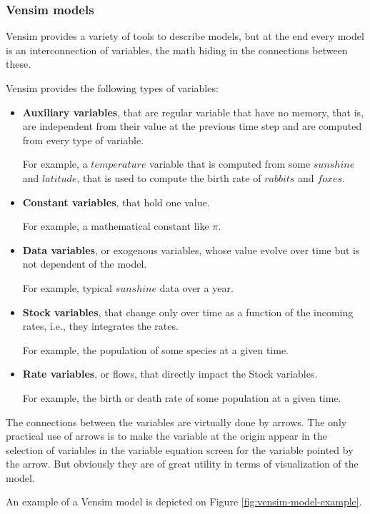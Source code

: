 \subsubsection{Vensim models}

Vensim provides a variety of tools to describe models, but at the end every model is an interconnection of variables, the math hiding in the connections between these. 

Vensim provides the following types of variables:
\begin{itemize}
    \item \textbf{Auxiliary variables}, that are regular variable that have no memory, that is, are independent from their value at the previous time step and are computed from every type of variable.

    For example, a $temperature$ variable that is computed from some $sunshine$ and $latitude$, that is used to compute the birth rate of $rabbits$ and $foxes$.

    \item \textbf{Constant variables}, that hold one value.
    
    For example, a mathematical constant like $\pi$.

    \item \textbf{Data variables}, or exogenous variables, whose value evolve over time but is not dependent of the model.

    For example, typical $sunshine$ data over a year.

    \item \textbf{Stock variables}, that change only over time as a function of the incoming rates, i.e., they integrates the rates.

    For example, the population of some species at a given time.

    \item \textbf{Rate variables}, or flows, that directly impact the Stock variables. 

    For example, the birth or death rate of some population at a given time.
\end{itemize}

The connections between the variables are virtually done by arrows. The only practical use of arrows is to make the variable at the origin appear in the selection of variables in the variable equation screen for the variable pointed by the arrow. But obviously they are of great utility in terms of visualization of the model.

An example of a Vensim model is depicted on Figure \ref{fig:vensim-model-example}.

